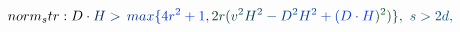 \documentclass[12pt]{article}
\begin{document}
\begin{displaymath}
{norm_str:
D} \mathcolor[RGB]{0,45,75}{\cdot} \mathcolor[RGB]{0,45,90}{H} \mathcolor[RGB]{0,45,105}{>} \mathcolor[RGB]{0,45,120}{\operatorname*} { \mathcolor[RGB]{0,45,135}{m} \mathcolor[RGB]{0,45,150}{a} \mathcolor[RGB]{0,45,165}{x} } \mathcolor[RGB]{0,45,180}{\{} \mathcolor[RGB]{0,45,195}{4} \mathcolor[RGB]{0,45,210}{r} ^ { \mathcolor[RGB]{0,45,225}{2} } \mathcolor[RGB]{0,45,240}{+} \mathcolor[RGB]{0,45,255}{1} \mathcolor[RGB]{0,60,0}{,} \mathcolor[RGB]{0,60,15}{2} \mathcolor[RGB]{0,60,30}{r} \mathcolor[RGB]{0,60,45}{(} \mathcolor[RGB]{0,60,60}{v} ^ { \mathcolor[RGB]{0,60,75}{2} } \mathcolor[RGB]{0,60,90}{H} ^ { \mathcolor[RGB]{0,60,105}{2} } \mathcolor[RGB]{0,60,120}{-} \mathcolor[RGB]{0,60,135}{D} ^ { \mathcolor[RGB]{0,60,150}{2} } \mathcolor[RGB]{0,60,165}{H} ^ { \mathcolor[RGB]{0,60,180}{2} } \mathcolor[RGB]{0,60,195}{+} \mathcolor[RGB]{0,60,210}{(} \mathcolor[RGB]{0,60,225}{D} \mathcolor[RGB]{0,60,240}{\cdot} \mathcolor[RGB]{0,60,255}{H} \mathcolor[RGB]{0,75,0}{)} ^ { \mathcolor[RGB]{0,75,15}{2} } \mathcolor[RGB]{0,75,30}{)} \mathcolor[RGB]{0,75,45}{\}} \mathcolor[RGB]{0,75,60}{,} \mathcolor[RGB]{0,75,75}{\nobreakspace} \mathcolor[RGB]{0,75,90}{s} \mathcolor[RGB]{0,75,105}{>} \mathcolor[RGB]{0,75,120}{2} \mathcolor[RGB]{0,75,135}{d} \mathcolor[RGB]{0,75,150}{,}
\end{displaymath}
\end{document}

